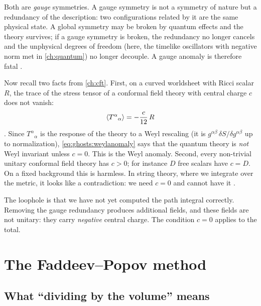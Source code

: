 Both are \emph{gauge} symmetries. A gauge symmetry is not a symmetry of nature but a
redundancy of the description: two configurations related by it are the same physical state.
A global symmetry may be broken by quantum effects and the theory survives; if a gauge
symmetry is broken, the redundancy no longer cancels and the unphysical degrees of freedom
(here, the timelike oscillators with negative norm met in \cref{ch:quantum}) no longer
decouple. A gauge anomaly is therefore fatal .

Now recall two facts from \cref{ch:cft}. First, on a curved worldsheet with Ricci scalar $R$,
the trace of the stress tensor of a conformal field theory with central charge $c$ does not
vanish:
\begin{equation}\label{eq:ghosts:weylanomaly}
  \langle T^\alpha{}_\alpha\rangle=-\frac{c}{12}\,R
\end{equation}
. Since $T^\alpha{}_\alpha$ is the response of the theory
to a Weyl rescaling (it is $g^{\alpha\beta}\,\delta S/\delta g^{\alpha\beta}$ up to
normalization), \cref{eq:ghosts:weylanomaly} says that the quantum theory is \emph{not} Weyl
invariant unless $c=0$. This is the Weyl anomaly. Second, every
non-trivial unitary conformal field theory has $c>0$; for instance $D$ free scalars have
$c=D$. On a fixed background this is harmless. In string theory, where we integrate over the
metric, it looks like a contradiction: we need $c=0$ and cannot have it
.

The loophole is that we have not yet computed the path integral correctly. Removing the gauge
redundancy produces additional fields, and these fields are not unitary: they carry
\emph{negative} central charge. The condition $c=0$ applies to the total.

\section{The Faddeev--Popov method}\label{sec:ghosts:fp}

\subsection{What ``dividing by the volume'' means}

